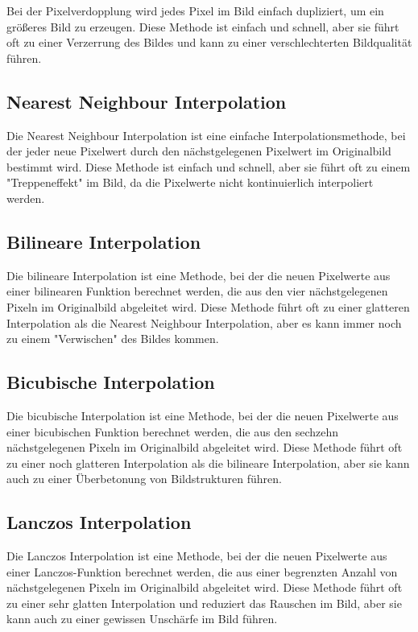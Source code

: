 Bei der Pixelverdopplung wird jedes Pixel im Bild einfach dupliziert, um ein größeres Bild zu erzeugen. 
Diese Methode ist einfach und schnell, aber sie führt oft zu einer Verzerrung des Bildes und kann zu einer verschlechterten Bildqualität führen.

\subsection{Nearest Neighbour Interpolation}

Die Nearest Neighbour Interpolation ist eine einfache Interpolationsmethode, bei der jeder neue Pixelwert durch den nächstgelegenen Pixelwert im Originalbild bestimmt wird. 
Diese Methode ist einfach und schnell, aber sie führt oft zu einem "Treppeneffekt" im Bild, da die Pixelwerte nicht kontinuierlich interpoliert werden.

\subsection{Bilineare Interpolation}

Die bilineare Interpolation ist eine Methode, bei der die neuen Pixelwerte aus einer bilinearen Funktion berechnet werden, die aus den vier nächstgelegenen Pixeln im Originalbild abgeleitet wird. 
Diese Methode führt oft zu einer glatteren Interpolation als die Nearest Neighbour Interpolation, aber es kann immer noch zu einem "Verwischen" des Bildes kommen.

\subsection{Bicubische Interpolation}

Die bicubische Interpolation ist eine Methode, bei der die neuen Pixelwerte aus einer bicubischen Funktion berechnet werden, die aus den sechzehn nächstgelegenen Pixeln im Originalbild abgeleitet wird.
Diese Methode führt oft zu einer noch glatteren Interpolation als die bilineare Interpolation, aber sie kann auch zu einer Überbetonung von Bildstrukturen führen.

\subsection{Lanczos Interpolation}
Die Lanczos Interpolation ist eine Methode, bei der die neuen Pixelwerte aus einer Lanczos-Funktion berechnet werden, die aus einer begrenzten Anzahl von nächstgelegenen Pixeln im Originalbild abgeleitet wird. 
Diese Methode führt oft zu einer sehr glatten Interpolation und reduziert das Rauschen im Bild, aber sie kann auch zu einer gewissen Unschärfe im Bild führen.

